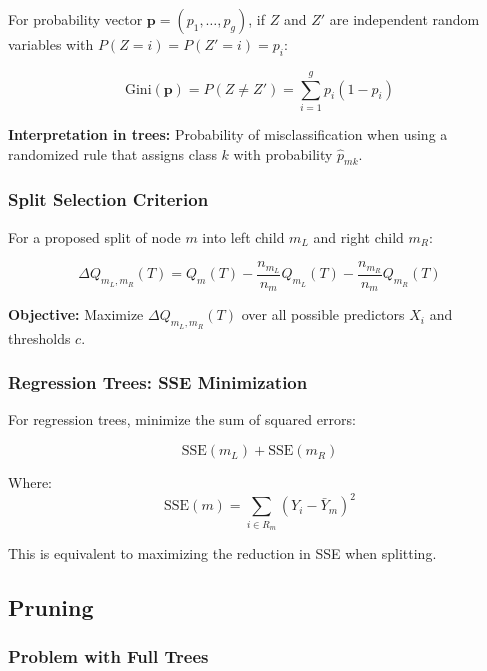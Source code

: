\documentclass[12pt,a4paper]{article}
\begin{document}
For probability vector $\mathbf{p} = (p_1, \ldots, p_g)$, if $Z$ and $Z'$ are independent random variables with $P(Z = i) = P(Z' = i) = p_i$:

\begin{equation}
\text{Gini}(\mathbf{p}) = P(Z \neq Z') = \sum_{i=1}^g p_i(1-p_i)
\end{equation}

\textbf{Interpretation in trees:} Probability of misclassification when using a randomized rule that assigns class $k$ with probability $\hat{p}_{mk}$.

\subsubsection{Split Selection Criterion}

For a proposed split of node $m$ into left child $m_L$ and right child $m_R$:

\begin{equation}
\Delta Q_{m_L,m_R}(T) = Q_m(T) - \frac{n_{m_L}}{n_m} Q_{m_L}(T) - \frac{n_{m_R}}{n_m} Q_{m_R}(T)
\end{equation}

\textbf{Objective:} Maximize $\Delta Q_{m_L,m_R}(T)$ over all possible predictors $X_i$ and thresholds $c$.

\subsubsection{Regression Trees: SSE Minimization}

For regression trees, minimize the sum of squared errors:

\begin{equation}
\text{SSE}(m_L) + \text{SSE}(m_R)
\end{equation}

Where:
\begin{equation}
\text{SSE}(m) = \sum_{i \in R_m} (Y_i - \bar{Y}_m)^2
\end{equation}

This is equivalent to maximizing the reduction in SSE when splitting.

\subsection{Pruning}

\subsubsection{Problem with Full Trees}
\end{document}
